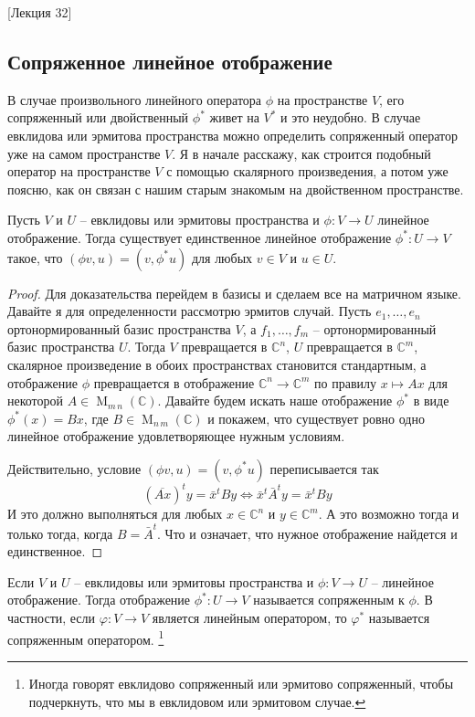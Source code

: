 [Лекция 32]


\subsection{Сопряженное линейное отображение}

В случае произвольного линейного оператора $\phi$ на пространстве $V$, его сопряженный или двойственный $\phi^*$ живет на $V^*$ и это неудобно.
В случае евклидова или эрмитова пространства можно определить сопряженный оператор уже на самом пространстве $V$.
Я в начале расскажу, как строится подобный оператор на пространстве $V$ с помощью скалярного произведения, а потом уже поясню, как он связан с нашим старым знакомым на двойственном пространстве.

\begin{claim}
Пусть $V$ и $U$ -- евклидовы или эрмитовы пространства и $\phi\colon V\to U$ линейное отображение.
Тогда существует единственное линейное отображение $\phi^*\colon U\to V$ такое, что $(\phi v, u) = (v, \phi^* u)$ для любых $v\in V$ и $u\in U$.
\end{claim}
\begin{proof}
Для доказательства перейдем в базисы и сделаем все на матричном языке.
Давайте я для определенности рассмотрю эрмитов случай.
Пусть $e_1,\ldots,e_n$ ортонормированный базис пространства $V$, а $f_1,\ldots,f_m$ -- ортонормированный базис пространства $U$.
Тогда $V$ превращается в $\mathbb C^n$, $U$ превращается в $\mathbb C^m$, скалярное произведение в обоих пространствах становится стандартным, а отображение $\phi$ превращается в отображение $\mathbb C^n \to \mathbb C^m$ по правилу $x \mapsto Ax$ для некоторой $A\in\operatorname{M}_{m\,n}(\mathbb C)$.
Давайте будем искать наше отображение $\phi^*$  в виде $\phi^*(x) = Bx$, где $B\in \operatorname{M}_{n\,m}(\mathbb C)$ и покажем, что существует ровно одно линейное отображение удовлетворяющее нужным условиям.

Действительно, условие $(\phi v, u) = (v, \phi^* u)$ переписывается так
\[
(\overline{Ax})^t y = \bar x^t By\iff \bar x^t \bar A^t y = \bar x^t B y
\]
И это должно выполняться для любых $x\in \mathbb C^n$ и $y\in \mathbb C^m$.
А это возможно тогда и только тогда, когда $B = \bar A^t$.
Что и означает, что нужное отображение найдется и единственное.
\end{proof}

\begin{definition}
Если $V$ и $U$ -- евклидовы или эрмитовы пространства и $\phi\colon V\to U$ -- линейное отображение.
Тогда отображение $\phi^*\colon U\to V$ называется сопряженным к $\phi$.
В частности, если $\varphi\colon V\to V$ является линейным оператором, то $\varphi^*$ называется сопряженным оператором.%
\footnote{Иногда говорят евклидово сопряженный или эрмитово сопряженный, чтобы подчеркнуть, что мы в евклидовом или эрмитовом случае.}
\end{definition}

